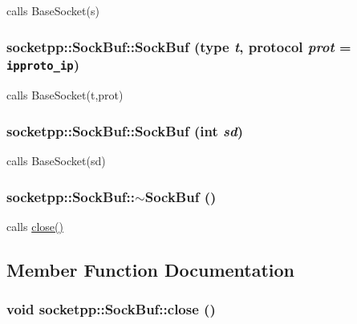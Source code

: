 calls BaseSocket(s) 

\hypertarget{classsocketpp_1_1SockBuf_5e8a5860fd67228e5d39ea28f9d67341}{
\subsubsection[{SockBuf}]{\setlength{\rightskip}{0pt plus 5cm}socketpp::SockBuf::SockBuf ({\bf type} {\em t}, \/  {\bf protocol} {\em prot} = {\tt ipproto\_\-ip})}}
\label{classsocketpp_1_1SockBuf_5e8a5860fd67228e5d39ea28f9d67341}


calls BaseSocket(t,prot) 

\hypertarget{classsocketpp_1_1SockBuf_71bbd8cf2bd9dd79b8067b0ef771bf23}{
\subsubsection[{SockBuf}]{\setlength{\rightskip}{0pt plus 5cm}socketpp::SockBuf::SockBuf (int {\em sd})}}
\label{classsocketpp_1_1SockBuf_71bbd8cf2bd9dd79b8067b0ef771bf23}


calls BaseSocket(sd) 

\hypertarget{classsocketpp_1_1SockBuf_ee857faaed622effa453c7b53749ff14}{
\subsubsection[{$\sim$SockBuf}]{\setlength{\rightskip}{0pt plus 5cm}socketpp::SockBuf::$\sim$SockBuf ()}}
\label{classsocketpp_1_1SockBuf_ee857faaed622effa453c7b53749ff14}


calls \hyperlink{classsocketpp_1_1SockBuf_28f88c6ac0570ee5e9d57e255733b0f9}{close()} 



\subsection{Member Function Documentation}
\hypertarget{classsocketpp_1_1SockBuf_28f88c6ac0570ee5e9d57e255733b0f9}{
\subsubsection[{close}]{\setlength{\rightskip}{0pt plus 5cm}void socketpp::SockBuf::close ()}}
\label{classsocketpp_1_1SockBuf_28f88c6ac0570ee5e9d57e255733b0f9}


